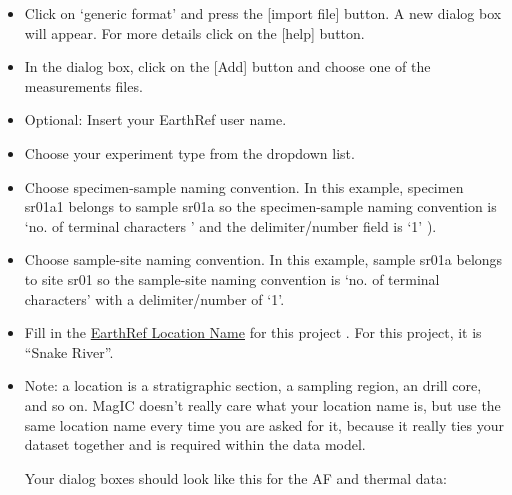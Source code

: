 \documentclass[11pt]{book}
\begin{document}
{\begin{itemize}
\item  Click on  `generic format'  and press the  [import file] button.  A new dialog box will appear. For more details click on the [help] button.
\item  In the dialog box, click on the [Add] button and choose one of the measurements files.
\item  Optional: Insert your EarthRef user name.
\item Choose your experiment type from the dropdown list.

\item Choose specimen-sample naming convention.  In this example, specimen sr01a1 belongs to sample sr01a so the specimen-sample naming convention is  `no. of terminal characters ' and the delimiter/number field is `1' ).
\item Choose sample-site naming convention.  In this example, sample sr01a belongs to site sr01 so the sample-site naming convention is  `no. of terminal characters' with a delimiter/number of  `1'.
\item  Fill in the \href{#MagICDatabase}{EarthRef Location Name}  for this project .  For this project, it is ``Snake River''.

\item Note:  a location is a stratigraphic section,  a sampling region,  an drill core, and so on.  MagIC doesn't really care what your location name is, but use the same location name every time you are asked for it, because it really ties your dataset together and is required within the data model.

Your dialog boxes should look like this for the AF and thermal data:


\end{itemize}}
\end{document}
